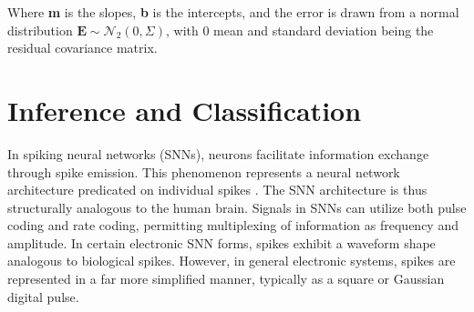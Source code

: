 \noindent Where \textbf{m} is the slopes, \textbf{b} is the intercepts, and the error is drawn from a normal distribution $\textbf{E} \sim \mathcal{N}_2\left( 0, \Sigma \right)$, with 0 mean and standard deviation being the residual covariance matrix.

\section{Inference and Classification}




In spiking neural networks (SNNs), neurons facilitate information exchange through spike emission. This phenomenon represents a neural network architecture predicated on individual spikes \cite{liu2014memristor}. The SNN architecture is thus structurally analogous to the human brain. Signals in SNNs can utilize both pulse coding and rate coding, permitting multiplexing of information as frequency and amplitude. In certain electronic SNN forms, spikes exhibit a waveform shape analogous to biological spikes. However, in general electronic systems, spikes are represented in a far more simplified manner, typically as a square or Gaussian digital pulse.\\

